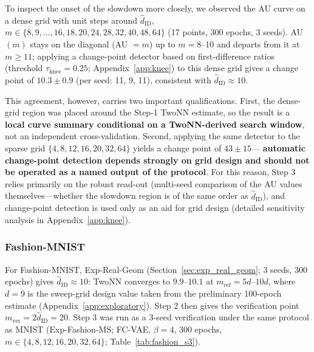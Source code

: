 \documentclass[make,article,submit,pdftex,moreauthors]{Definitions/mdpi}
\newcommand{\hatdID}{\hat{d}_{\mathrm{ID}}}
\begin{document}
To inspect the onset of the slowdown more closely, we observed the AU curve
on a dense grid with unit steps around $\hatdID$,
$m \in \{8, 9, \ldots, 16, 18, 20, 24, 28, 32, 40, 48, 64\}$ (17 points,
300 epochs, 3 seeds).
AU$(m)$ stays on the diagonal (AU $= m$) up to $m = 8$--10 and departs from
it at $m \geq 11$; applying a change-point detector based on
first-difference ratios (threshold $\tau_{\mathrm{knee}} = 0.25$;
Appendix~\ref{app:knee}) to this dense grid gives a change point of
$10.3 \pm 0.9$ (per seed: 11, 9, 11), consistent with
$\hatdID \approx 10$.

This agreement, however, carries two important qualifications.
First, the dense-grid region was placed around the Step-1 TwoNN estimate,
so the result is a \textbf{local curve summary conditional on a
TwoNN-derived search window}, not an independent cross-validation.
Second, applying the same detector to the sparse grid
$\{4, 8, 12, 16, 20, 32, 64\}$ yields a change point of $43 \pm 15$---%
\textbf{automatic change-point detection depends strongly on grid design and
should not be operated as a named output of the protocol}.
For this reason, Step 3 relies primarily on the robust read-out
(multi-seed comparison of the AU values themselves---whether the slowdown
region is of the same order as $\hatdID$), and change-point detection is
used only as an aid for grid design (detailed sensitivity analysis in
Appendix~\ref{app:knee}).

\subsubsection{Fashion-MNIST}\label{sec:exp_fashion}

For Fashion-MNIST, Exp-Real-Geom (Section~\ref{sec:exp_real_geom}; 3 seeds,
300 epochs) gives $\hatdID \approx 10$: TwoNN converges to $9.9$--$10.1$
at $m_{\mathrm{ref}} = 5d$--$10d$, where $d = 9$ is the sweep-grid design
value taken from the preliminary 100-epoch estimate
(Appendix~\ref{app:exploratory}).
Step 2 then gives the verification point $m_{\mathrm{ver}} = 2\hatdID = 20$.
Step 3 was run as a 3-seed verification under the same protocol as MNIST
(Exp-Fashion-MS; FC-VAE, $\beta = 4$, 300 epochs,
$m \in \{4, 8, 12, 16, 20, 32, 64\}$; Table~\ref{tab:fashion_s3}).
\end{document}
